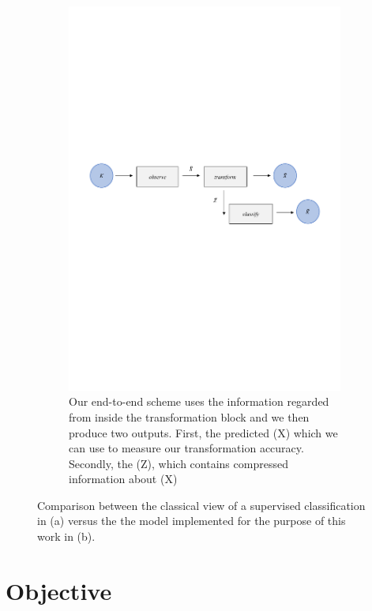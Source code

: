 \begin{figure}[H]
\begin{subfigure}{1\textwidth} 
  \centering
  \includegraphics[width=16.5cm]{Figuras_tfg/Figura1_1_tfg}
  \caption{Our end-to-end scheme uses the information regarded from inside the transformation block and we then produce two outputs. First, the predicted (X) which we can use to measure our transformation accuracy. Secondly, the (Z), which contains compressed information about (X)}
  \label{fig:fig1a} 
\end{subfigure}%
\caption{Comparison between the classical view of a supervised classification in (a) versus the the model implemented for the purpose of this work in (b).}
\label{fig:fig1}
\end{figure}

\section{Objective}

